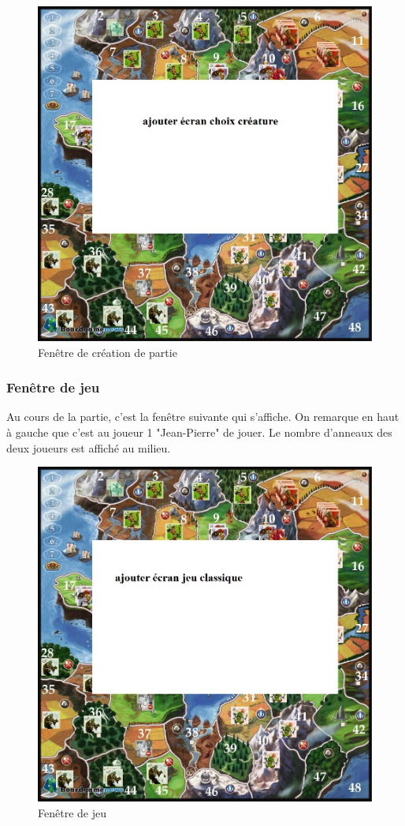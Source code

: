 \begin{figure}[ht!]
\centering
\includegraphics[scale=0.40]{img/crea.jpg}
\caption{Fenêtre de création de partie}
\end{figure}
\newpage


\subsubsection{Fenêtre de jeu}
Au cours de la partie, c'est la fenêtre suivante qui s'affiche. On remarque en haut à gauche que c'est au joueur 1 "Jean-Pierre" de jouer. Le nombre d'anneaux des deux joueurs est affiché au milieu.

\begin{figure}[ht!]
\centering
\includegraphics[scale=0.40]{img/jeu.jpg}
\caption{Fenêtre de jeu}
\end{figure}
\newpage

